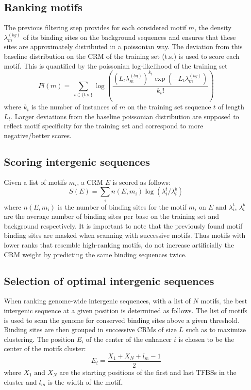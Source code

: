 \documentclass[a4,center,fleqn]{NAR}
\begin{document}
\subsection{Ranking motifs}
The previous filtering step provides for each considered motif $m$, the density
$\lambda^{(bg)}_m$ of its binding sites on the background sequences and ensures
that these sites are  approximately distributed in a poissonian way.
The deviation from this baseline distribution on the CRM of the training set
(t.s.) is used to score each motif.
This is quantified by the poissonian log-likelihood of the training set
\begin{equation}
   Pl(m)=\  \sum_{t\in\{\mathrm{t.s.}\}} \log\left(\frac{\left(L_t \lambda^{(bg)}_m\right)^{k_t} \exp(-L_t \lambda^{(bg)}_m)}{k_t!}\right)
   \label{motscore}
\end{equation}
where $k_t$ is the number of instances of $m$ on the training set sequence $t$
of length $L_t$.
Larger deviations from the baseline poissonian distribution are supposed to
reflect motif specificity for the training set and correspond to more
negative/better scores.

\subsection{Scoring intergenic sequences}
Given a list of motifs $m_i$, a CRM $E$ is scored  as follows:
\begin{equation}
    S(E)=\sum_{i} n(E,m_i) \log(\lambda_i^t/\lambda_i^b)
    \label{score_enh}
\end{equation}
where $n(E,m_i)$ is the number of binding sites for the motif $m_i$ on $E$ and
$\lambda_i^t$, $\lambda_i^b$ are the average number of binding sites per base
on the training set and background respectively.
It is important to note that the previously found motif binding sites are
masked when scanning with successive motifs.
Thus motifs with lower ranks that resemble  high-ranking motifs, do not
increase artificially the CRM weight by predicting the same binding sequences
twice. 

\subsection*{Selection of optimal intergenic sequences}
When ranking genome-wide intergenic sequences, with a list of $N$ motifs,
the best intergenic sequence at a given position is determined as follows.
The list of motifs is used to scan the genome for conserved binding sites
above a given threshold. Binding sites are then  grouped in
successive CRMs of size $L$ such as to maximize clustering.
The position $E_i$ of the center of the enhancer $i$ is chosen to be the center
of the motifs cluster:
\begin{equation}
E_i = \frac{X_1+X_N+l_m-1}{2} 
\end{equation} 
where $X_1$ and $X_N$ are the starting positions of the first and last TFBSs in
the cluster and $l_m$ is the width of the motif.
\end{document}
